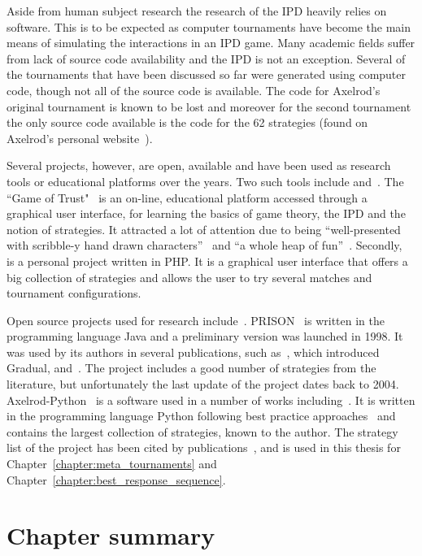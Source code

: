 Aside from human subject research the research of the IPD heavily relies on software.
This is to be expected as computer tournaments have become the main
means of simulating the interactions in an IPD game.
Many academic fields suffer from lack of source code availability and the IPD
is not an exception. Several of the tournaments that have been discussed so far were generated
using computer code, though not all of the source code is available.
The code for Axelrod's original tournament is known to be lost and
moreover for the second tournament the only source code available is the code
for the 62 strategies (found on Axelrod's personal website~\cite{fortan_code}).

Several projects, however, are open, available and have been used as research
tools or educational platforms over the years. Two such tools include
\cite{pd_trust} and~\cite{trust_blogb}.
The ``Game of Trust"~\cite{pd_trust} is an on-line, educational platform accessed 
through a graphical user interface,
for learning the basics of game theory, the IPD
and the notion of strategies. It attracted a lot of attention
due to being ``well-presented with scribble-y hand drawn
characters''~\cite{trust_blogb} and ``a whole heap of fun''~\cite{trust_bloga}.
Secondly,~\cite{pd_game} is a personal project written in PHP. It is a graphical user
interface that offers a big collection of strategies and allows the user to try
several matches and tournament configurations.

Open source projects used for research include~\cite{prison, axelrodproject}.
PRISON~\cite{prison} is written in the programming language Java and a
preliminary version was launched in 1998. It was used by its authors in several
publications, such as~\cite{Beaufils1997}, which introduced Gradual,
and~\cite{Beaufils1988}. The project includes a good number of strategies from
the literature, but unfortunately the last update of the project dates back to
2004. Axelrod-Python~\cite{axelrodproject} is a software used
in a number of works including~\cite{Knight2017,KnightHGC17, Goodman2018, Wang2017}. 
It is written in the
programming language Python following best practice
approaches~\cite{Aberdour2007, Benureau2018} and contains the largest collection
of strategies, known to the author. The strategy list of the project has been
cited by publications~\cite{Anastassacos2018, Hayes2017, Neumann2018}, and is
used in this thesis for Chapter~\ref{chapter:meta_tournaments} and
Chapter~\ref{chapter:best_response_sequence}.

\section{Chapter summary}

